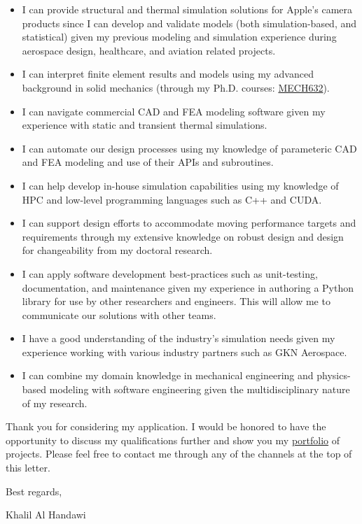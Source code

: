\documentclass[12pt]{article} %
\begin{document}
\begin{itemize}
	\item I can provide structural and thermal simulation solutions for Apple's camera products since I can develop and validate models (both simulation-based, and statistical) given my previous modeling and simulation experience during aerospace design, healthcare, and aviation related projects. 
	\item I can interpret finite element results and models using my advanced background in solid mechanics (through my Ph.D. courses: \href{https://www.mcgill.ca/study/2022-2023/courses/mech-632}{MECH632}).
	\item I can navigate commercial CAD and FEA modeling software given my experience with static and transient thermal simulations.
	\item I can automate our design processes using my knowledge of parameteric CAD and FEA modeling and use of their APIs and subroutines.
	\item I can help develop in-house simulation capabilities using my knowledge of HPC and low-level programming languages such as C++ and CUDA.
	\item I can support design efforts to accommodate moving performance targets and requirements through my extensive knowledge on robust design and design for changeability from my doctoral research.
	\item I can apply software development best-practices such as unit-testing, documentation, and maintenance given my experience in authoring a Python library for use by other researchers and engineers. This will allow me to communicate our solutions with other teams.
	\item I have a good understanding of the industry's simulation needs given my experience working with various industry partners such as GKN Aerospace.
	\item I can combine my domain knowledge in mechanical engineering and physics-based modeling with software engineering given the multidisciplinary nature of my research.
\end{itemize}

\medskip %

Thank you for considering my application. I would be honored to have the opportunity to discuss my qualifications further and show you my \href{https://khbalhandawi.github.io/projects/}{portfolio} of projects. Please feel free to contact me through any of the channels at the top of this letter.

\medskip %

Best regards,

\medskip %


Khalil Al Handawi


\medskip %

\end{document}
